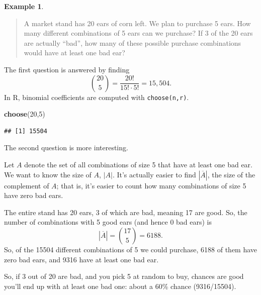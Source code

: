 \documentclass[
]{book}
\newenvironment{Shaded}{\begin{snugshade}}{\end{snugshade}}
\newcommand{\DecValTok}[1]{\textcolor[rgb]{0.00,0.00,0.81}{#1}}
\newcommand{\FunctionTok}[1]{\textcolor[rgb]{0.13,0.29,0.53}{\textbf{#1}}}
\newcommand{\NormalTok}[1]{#1}
\theoremstyle{definition}
\theoremstyle{definition}
\newtheorem{example}{Example}[chapter]
\theoremstyle{definition}
\theoremstyle{definition}
\theoremstyle{remark}
\begin{document}
\begin{example}
\protect\hypertarget{exm:cnr-choose-corn}{}\label{exm:cnr-choose-corn}\leavevmode

\begin{quote}
A market stand has 20 ears of corn left. We plan to purchase 5 ears. How many different combinations of 5 ears can we purchase? If 3 of the 20 ears are actually ``bad'', how many of these possible purchase combinations would have at least one bad ear?
\end{quote}

The first question is answered by finding \[\binom{20}{5} = \frac{20!}{15!\cdot 5!} = 15,504.\]
In R, binomial coefficients are computed with \texttt{choose(n,r)}.

\begin{Shaded}
\begin{Highlighting}[]
\FunctionTok{choose}\NormalTok{(}\DecValTok{20}\NormalTok{,}\DecValTok{5}\NormalTok{)}
\end{Highlighting}
\end{Shaded}

\begin{verbatim}
## [1] 15504
\end{verbatim}

The second question is more interesting.

Let \(A\) denote the set of all combinations of size 5 that have at least one bad ear. We want to know the size of \(A\), \(|A|\). It's actually easier to find \(|\overline{A}|\), the size of the complement of \(A\); that is, it's easier to count how many combinations of size 5 have zero bad ears.

The entire stand has 20 ears, 3 of which are bad, meaning 17 are good. So, the number of combinations with 5 good ears (and hence 0 bad ears) is \[|\overline{A}| = \binom{17}{5} = 6188.\]
So, of the 15504 different combinations of 5 we could purchase, 6188 of them have zero bad ears, and 9316 have at least one bad ear.

So, if 3 out of 20 are bad, and you pick 5 at random to buy, chances are good you'll end up with at least one bad one: about a 60\% chance (9316/15504).

\end{example}
\end{document}
